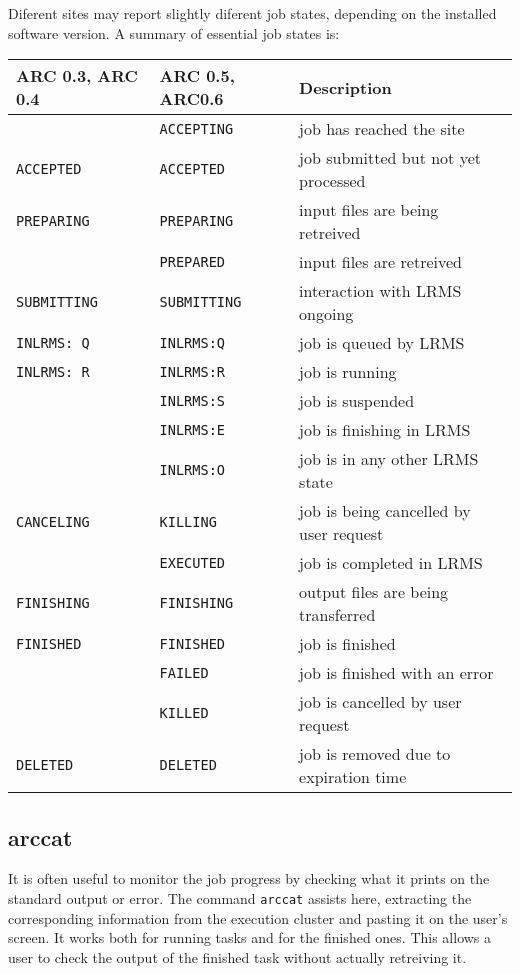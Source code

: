 Diferent sites may report slightly diferent job states, depending on
the installed software version. A summary of essential job
states is:

\begin{longtable}{l|l|p{8cm}}
ARC 0.3, ARC 0.4 & ARC 0.5, ARC0.6 & Description\\ \hline
                   &\texttt{ACCEPTING} &job has reached the site\\
\texttt{ACCEPTED}  &\texttt{ACCEPTED}  &job submitted but not yet processed\\
\texttt{PREPARING} &\texttt{PREPARING} &input files are being retreived\\
                   &\texttt{PREPARED}  &input files are retreived\\
\texttt{SUBMITTING}&\texttt{SUBMITTING}&interaction with LRMS ongoing\\
\texttt{INLRMS: Q} &\texttt{INLRMS:Q}  &job is queued by LRMS\\
\texttt{INLRMS: R} &\texttt{INLRMS:R}  &job is running\\
                   &\texttt{INLRMS:S}  &job is suspended\\
                   &\texttt{INLRMS:E}  &job is finishing in LRMS\\
                   &\texttt{INLRMS:O}  &job is in any other LRMS state\\
\texttt{CANCELING} &\texttt{KILLING}   &job is being cancelled by user request\\
                   &\texttt{EXECUTED}  &job is completed in LRMS\\
\texttt{FINISHING} &\texttt{FINISHING} &output files are being transferred\\
\texttt{FINISHED}  &\texttt{FINISHED}  &job is finished\\
                   &\texttt{FAILED}    &job is finished with an error\\
                   &\texttt{KILLED}    &job is cancelled by user request\\
\texttt{DELETED}   &\texttt{DELETED}   &job is removed due to expiration time\\
\end{longtable}

\subsection{arccat}
\label{sec:arccat}

It is often useful to monitor the job progress by checking what it
prints on the standard output or error. The command \texttt{arccat}
 assists here, extracting the
corresponding information from the execution cluster and pasting it
on the user's screen. It works both for running tasks and for the
finished ones. This allows a user to check the output of the
finished task without actually retreiving it.

